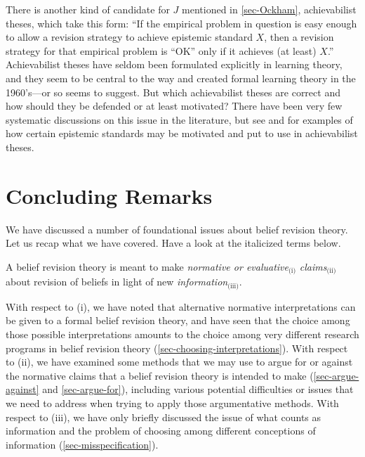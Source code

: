 There is another kind of candidate for $J$ mentioned in \autoref{sec-Ockham}, achievabilist theses, which take this form: ``If the empirical problem in question is easy enough to allow a revision strategy to achieve epistemic standard $X$, then a revision strategy for that empirical problem is ``OK'' only if it achieves (at least) $X$.'' Achievabilist theses have seldom been formulated explicitly in learning theory, and they seem to be central to the way \citet{putnam1965trial} and \citet{gold1967language} created formal learning theory in the 1960's---or so \citet{kelly1996logic} seems to suggest. But which achievabilist theses are correct and how should they be defended or at least motivated? There have been very few systematic discussions on this issue in the literature, but see \citet{kelly2016realism} and \citet{genin2015theory} for examples of how certain epistemic standards may be motivated and put to use in achievabilist theses. 




\section{Concluding Remarks}\label{lin-conclusion}

We have discussed a number of foundational issues about belief revision theory. Let us recap what we have covered. Have a look at the italicized terms below. \op

	\xm A belief revision theory is meant to make \textit{normative or evaluative}$_\text{(i)}$ \textit{claims}$_\text{(ii)}$ about revision of beliefs in light of new \textit{information}$_\text{(iii)}$.

\ed With respect to (i), we have noted that alternative normative interpretations can be given to a formal belief revision theory, and have seen that the choice among those possible interpretations amounts to the choice among very different research programs in belief revision theory (\autoref{sec-choosing-interpretations}). With respect to (ii), we have examined some methods that we may use to argue for or against the normative claims that a belief revision theory is intended to make (\autoref{sec-argue-against} and \autoref{sec-argue-for}), including various potential difficulties or issues that we need to address when trying to apply those argumentative methods. With respect to (iii), we have only briefly discussed the issue of what counts as information and the problem of choosing among different conceptions of information (\autoref{sec-misspecification}). 

